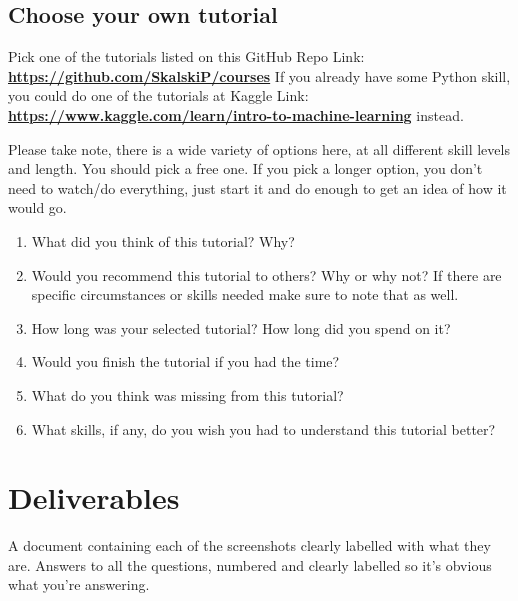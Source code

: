 \documentclass[12pt]{article}
\begin{document}
\subsection*{Choose your own tutorial}

Pick one of the tutorials listed on this GitHub Repo Link: \href{https://github.com/SkalskiP/courses}{\textbf{https://github.com/SkalskiP/courses}}  If you already have some Python skill, you could do one of the tutorials at Kaggle Link: \href{https://www.kaggle.com/learn/intro-to-machine-learning}{\textbf{https://www.kaggle.com/learn/intro-to-machine-learning}} instead.  

Please take note, there is a wide variety of options here, at all different skill levels and length.  You should pick a free one.  If you pick a longer option, you don't need to watch/do everything, just start it and do enough to get an idea of how it would go.


    \begin{enumerate}
        \item What did you think of this tutorial? Why?
        \item Would you recommend this tutorial to others? Why or why not? If there are specific circumstances or skills needed make sure to note that as well.
        \item How long was your selected tutorial? How long did you spend on it?
        \item Would you finish the tutorial if you had the time?
        \item What do you think was missing from this tutorial?
        \item What skills, if any, do you wish you had to understand this tutorial better?
    \end{enumerate}




\section*{Deliverables}
A document containing each of the screenshots clearly labelled with what they are.  Answers to all the questions, numbered and clearly labelled so it's obvious what you're answering.  
\end{document}
